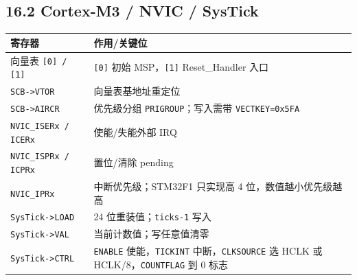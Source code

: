 \documentclass[UTF8,zihao=-5]{ctexart}
\renewcommand{\arraystretch}{0.9}
\begin{document}
\begin{multicols*}{2}
\subsection*{16.2 Cortex-M3 / NVIC / SysTick}
{\scriptsize\setlength{\tabcolsep}{1.8pt}\renewcommand{\arraystretch}{0.88}%
\begin{tabularx}{\linewidth}{@{}*{2}{Y}@{}}
\toprule
\textbf{寄存器} & \textbf{作用/关键位} \\
\midrule
向量表 \texttt{[0] / [1]} & \texttt{[0]} 初始 MSP，\texttt{[1]} Reset\_Handler 入口 \\
\texttt{SCB-\textgreater{}VTOR} & 向量表基地址重定位 \\
\texttt{SCB-\textgreater{}AIRCR} & 优先级分组 \texttt{PRIGROUP}；写入需带 \texttt{VECTKEY=0x5FA} \\
\texttt{NVIC\_ISERx / ICERx} & 使能/失能外部 IRQ \\
\texttt{NVIC\_ISPRx / ICPRx} & 置位/清除 pending \\
\texttt{NVIC\_IPRx} & 中断优先级；STM32F1 只实现高 4 位，数值越小优先级越高 \\
\texttt{SysTick-\textgreater{}LOAD} & 24 位重装值；\texttt{ticks-1} 写入 \\
\texttt{SysTick-\textgreater{}VAL} & 当前计数值；写任意值清零 \\
\texttt{SysTick-\textgreater{}CTRL} & \texttt{ENABLE} 使能，\texttt{TICKINT} 中断，\texttt{CLKSOURCE} 选 HCLK 或 HCLK/8，\texttt{COUNTFLAG} 到 0 标志 \\
\bottomrule
\end{tabularx}}

\end{multicols*}
\end{document}

